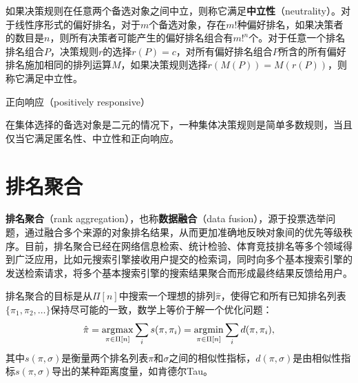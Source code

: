 \begin{definition}[中立性]
如果决策规则在任意两个备选对象之间中立，则称它满足\textbf{中立性}（neutrality）。对于线性序形式的偏好排名，对于$m$个备选对象，存在$m!$种偏好排名，如果决策者的数目是$n$，则所有决策者可能产生的偏好排名组合有$m!^n$个。对于任意一个排名排名组合$P$，决策规则$r$的选择$r(P)=c$，对所有偏好排名组合$P$所含的所有偏好排名施加相同的排列运算$M$，如果决策规则选择$r(M(P))=M(r(P))$，则称它满足中立性。
\end{definition}

\begin{definition}[正向响应]
正向响应（positively responsive）
\end{definition}

\begin{theorem}
在集体选择的备选对象是二元的情况下，一种集体决策规则是简单多数规则，当且仅当它满足匿名性、中立性和正向响应。
\end{theorem}


\section{排名聚合}
\textbf{排名聚合}（rank aggregation），也称\textbf{数据融合}（data fusion），源于投票选举问题，通过融合多个来源的对象排名结果，从而更加准确地反映对象间的优先等级秩序。目前，排名聚合已经在网络信息检索、统计检验、体育竞技排名等多个领域得到广泛应用，比如元搜索引擎接收用户提交的检索词，同时向多个基本搜索引擎的发送检索请求，将多个基本搜索引擎的搜索结果聚合而形成最终结果反馈给用户。

排名聚合的目标是从$\Pi[n]$中搜索一个理想的排列$\hat\pi$，使得它和所有已知排名列表$\{\pi_1,\pi_2,\ldots\}$保持尽可能的一致，数学上等价于解一个优化问题：
\begin{equation}\label{eq:rankaggregationproblem}
    \hat\pi = \operatorname*{\mathrm{\arg\!\max}}\limits_{\pi\in \Pi[n]} \sum\limits_i s(\pi,\pi_i) = \operatorname*{\mathrm{\arg\!\min}}\limits_{\pi\in \Pi[n]} \sum\limits_i d(\pi,\pi_i),
\end{equation}
其中$s(\pi,\sigma)$是衡量两个排名列表$\pi$和$\sigma$之间的相似性指标，$d(\pi,\sigma)$是由相似性指标$s(\pi,\sigma)$导出的某种距离度量，如肯德尔Tau。

